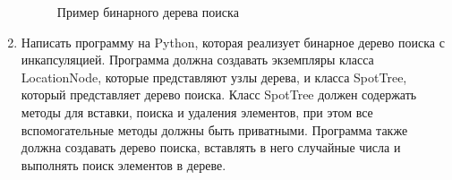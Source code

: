 \begin{enumerate}
\begin{figure}[h]
\centering
{}
\caption{Пример бинарного дерева поиска}
\end{figure}

\item Написать программу на Python, которая реализует бинарное дерево поиска с инкапсуляцией. Программа должна создавать экземпляры класса LocationNode, которые представляют узлы дерева, и класса SpotTree, который представляет дерево поиска. Класс SpotTree должен содержать методы для вставки, поиска и удаления элементов, при этом все вспомогательные методы должны быть приватными. Программа также должна создавать дерево поиска, вставлять в него случайные числа и выполнять поиск элементов в дереве.


\end{enumerate}
